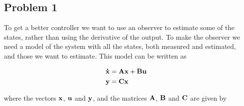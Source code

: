 \subsection{Problem 1}
To get a better controller we want to use an observer to estimate some of the states, rather than using the derivative of the output. To make the observer we need a model of the system with all the states, both measured and estimated, and those we want to estimate. This model can be written as

\begin{subequations}
	\begin{align*}
		\mathbf{\dot x} &= \mathbf{A}\mathbf{x} + \mathbf{B}\mathbf{u}\\
		\mathbf{y} &= \mathbf{C}\mathbf{x}
	\end{align*}
\end{subequations}

where the vectors $\mathbf{x}$, $\mathbf{u}$ and $\mathbf{y}$, and the matrices $\mathbf{A}$, $\mathbf{B}$ and $\mathbf{C}$ are given by

